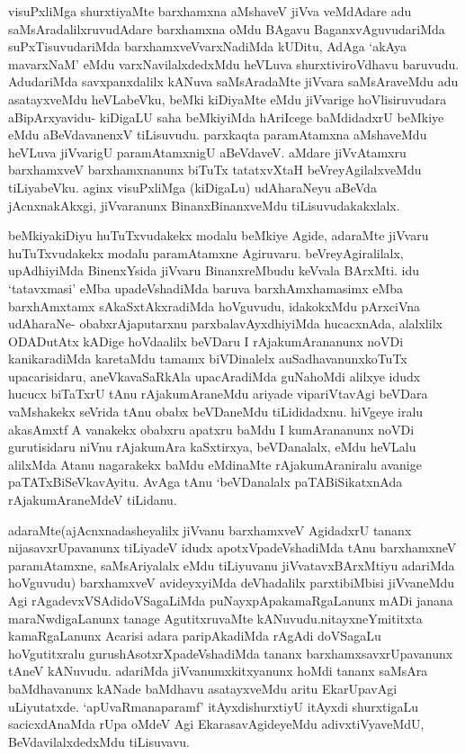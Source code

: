 \begin{artha}
visuPxliMga shurxtiyaMte barxhamxna aMshaveV jiVva veMdAdare adu
saMsAradalilxruvudAdare barxhamxna oMdu BAgavu BaganxvAguvudariMda
suPxTisuvudariMda barxhamxveVvarxNadiMda kUDitu, AdAga `akAya
mavarxNaM' eMdu varxNavilalxdedxMdu heVLuva shurxtiviroVdhavu
baruvudu. AdudariMda savxpanxdalilx kANuva saMsAradaMte jiVvara
saMsAraveMdu adu asatayxveMdu heVLabeVku, beMki kiDiyaMte eMdu
jiVvarige hoVlisiruvudara aBipArxyavidu- kiDigaLU saha beMkiyiMda
hAriIcege baMdidadxrU beMkiye eMdu aBeVdavanenxV tiLisuvudu. parxkaqta
paramAtamxna aMshaveMdu heVLuva jiVvarigU paramAtamxnigU
aBeVdaveV. aMdare jiVvAtamxru barxhamxveV barxhamxnanunx biTuTx
tatatxvXtaH beVreyAgilalxveMdu tiLiyabeVku. aginx visuPxliMga
(kiDigaLu) udAharaNeyu aBeVda jAcnxnakAkxgi, jiVvaranunx
BinanxBinanxveMdu tiLisuvudakakxlalx.
\end{artha}

\begin{artha}
beMkiyakiDiyu huTuTxvudakekx modalu beMkiye Agide, adaraMte jiVvaru
huTuTxvudakekx modalu paramAtamxne Agiruvaru. beVreyAgiralilalx,
upAdhiyiMda BinenxYsida jiVvaru BinanxreMbudu keVvala BArxMti. idu
`tatavxmasi' eMba upadeVshadiMda baruva barxhAmxhamasimx eMba
barxhAmxtamx sAkaSxtAkxradiMda hoVguvudu, idakokxMdu pArxciVna
udAharaNe- obabxrAjaputarxnu parxbalavAyxdhiyiMda hucacxnAda,
alalxlilx ODADutAtx kADige hoVdaalilx beVDaru I rAjakumArananunx
noVDi kanikaradiMda karetaMdu tamamx biVDinalelx auSadhavanunxkoTuTx
upacarisidaru, aneVkavaSaRkAla upacAradiMda guNahoMdi alilxye idudx
hucucx biTaTxrU tAnu rAjakumAraneMdu ariyade vipariVtavAgi beVDara
vaMshakekx seVrida tAnu obabx beVDaneMdu tiLididadxnu. hiVgeye iralu
akasAmxtf A vanakekx obabxru apatxru baMdu I kumArananunx noVDi
gurutisidaru niVnu rAjakumAra  kaSxtirxya, beVDanalalx, eMdu
heVLalu alilxMda Atanu nagarakekx baMdu eMdinaMte rAjakumAraniralu
avanige paTATxBiSeVkavAyitu. AvAga tAnu `beVDanalalx paTABiSikatxnAda
rAjakumAraneMdeV tiLidanu.
\end{artha}

\begin{artha}
adaraMte(ajAcnxnadasheyalilx jiVvanu barxhamxveV AgidadxrU tananx
nijasavxrUpavanunx tiLiyadeV idudx apotxVpadeVshadiMda tAnu
barxhamxneV paramAtamxne, saMsAriyalalx eMdu tiLiyuvanu jiVvatavxBArxMtiyu
adariMda hoVguvudu) barxhamxveV avideyxyiMda deVhadalilx parxtibiMbisi
jiVvaneMdu Agi rAgadevxVSAdidoVSagaLiMda puNayxpApakamaRgaLanunx mADi
janana maraNwdigaLanunx tanage AgutitxruvaMte
kANuvudu.nitayxneYmititxta kamaRgaLanunx Acarisi adara paripAkadiMda
rAgAdi doVSagaLu hoVgutitxralu gurushAsotxrXpadeVshadiMda tananx
barxhamxsavxrUpavanunx tAneV kANuvudu. adariMda jiVvanumxkitxyanunx
hoMdi tananx saMsAra baMdhavanunx kANade baMdhavu asatayxveMdu aritu
EkarUpavAgi uLiyutatxde. `apUvaRmanaparamf' itAyxdishurxtiyU itAyxdi
shurxtigaLu sacicxdAnaMda rUpa oMdeV Agi EkarasavAgideyeMdu
adivxtiVyaveMdU, BeVdavilalxdedxMdu tiLisuvavu.
\end{artha}


\begin{shl}

\end{shl}
